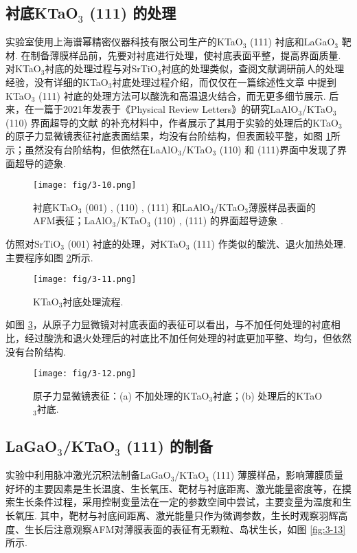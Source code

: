 \documentclass[12pt,a4paper,openany,twoside,UTF-8]{book}
\begin{document}
\subsection{衬底KTaO$_3$ (111) 的处理}
 实验室使用上海谱幂精密仪器科技有限公司生产的KTaO$_3$ (111) 衬底和LaGaO$_3$ 靶材. 在制备薄膜样品前，先要对衬底进行处理，使衬底表面平整，提高界面质量. 对KTaO$_3$衬底的处理过程与对SrTiO$_3$衬底的处理类似，查阅文献调研前人的处理经验，没有详细的KTaO$_3$衬底处理过程介绍，而仅仅在一篇综述性文章 \cite{ref12}中提到KTaO$_3$ (111) 衬底的处理方法可以酸洗和高温退火结合，而无更多细节展示. 后来，在一篇于2021年发表于《Physical Review Letters》的研究LaAlO$_3$/KTaO$_3$ (110) 界面超导的文献 \cite{ref21}的补充材料中，作者展示了其用于实验的处理后的KTaO$_3$的原子力显微镜表征衬底表面结果，均没有台阶结构，但表面较平整，如图 \ref{fig:3-10}所示；虽然没有台阶结构，但依然在LaAlO$_3$/KTaO$_3$ (110) 和 (111)界面中发现了界面超导的迹象.

\begin{figure}[htbp]
\centering
\texttt{[image: fig/3-10.png]}
\caption{衬底KTaO$_3$ (001) , (110) , (111) 和LaAlO$_3$/KTaO$_3$薄膜样品表面的AFM表征；LaAlO$_3$/KTaO$_3$ (110) , (111) 的界面超导迹象 \cite{ref21}.}
\label{fig:3-10} 
\end{figure}
 
仿照对SrTiO$_3$ (001) 衬底的处理，对KTaO$_3$ (111) 作类似的酸洗、退火加热处理. 主要程序如图 \ref{fig:3-11}所示.
\begin{figure}[htbp]
\centering
\texttt{[image: fig/3-11.png]}
\caption{KTaO$_3$衬底处理流程.}
\label{fig:3-11} 
\end{figure}

如图 \ref{fig:3-12}，从原子力显微镜对衬底表面的表征可以看出，与不加任何处理的衬底相比，经过酸洗和退火处理后的衬底比不加任何处理的衬底更加平整、均匀，但依然没有台阶结构.

\begin{figure}[htbp]
\centering
\texttt{[image: fig/3-12.png]}
\caption{原子力显微镜表征：(a) 不加处理的KTaO$_3$衬底；(b) 处理后的KTaO$_3$衬底.}
\label{fig:3-12} 
\end{figure}

\subsection{LaGaO$_3$/KTaO$_3$ (111) 的制备}
实验中利用脉冲激光沉积法制备LaGaO$_3$/KTaO$_3$ (111) 薄膜样品，影响薄膜质量好坏的主要因素是生长温度、生长氧压、靶材与衬底距离、激光能量密度等，在摸索生长条件过程，采用控制变量法在一定的参数空间中尝试，主要变量为温度和生长氧压. 其中，靶材与衬底间距离、激光能量只作为微调参数，生长时观察羽辉高度、生长后注意观察AFM对薄膜表面的表征有无颗粒、岛状生长，如图 \ref{fig:3-13}所示.
\end{document}
